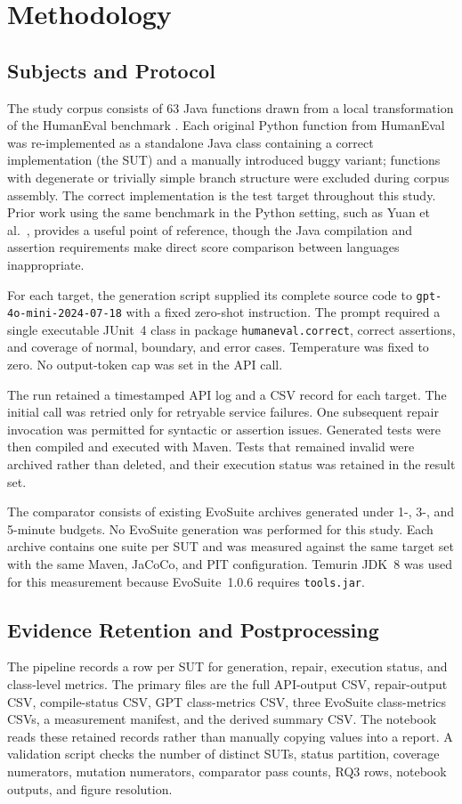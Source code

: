 \section{Methodology}
\label{sec:method}

\subsection{Subjects and Protocol}
The study corpus consists of 63 Java functions drawn from a local transformation of the HumanEval benchmark \cite{yuan2024junit}. Each original Python function from HumanEval was re-implemented as a standalone Java class containing a correct implementation (the SUT) and a manually introduced buggy variant; functions with degenerate or trivially simple branch structure were excluded during corpus assembly. The correct implementation is the test target throughout this study. Prior work using the same benchmark in the Python setting, such as Yuan et al.\ \cite{yuan2024junit}, provides a useful point of reference, though the Java compilation and assertion requirements make direct score comparison between languages inappropriate.

For each target, the generation script supplied its complete source code to \texttt{gpt-4o-mini-2024-07-18} with a fixed zero-shot instruction. The prompt required a single executable JUnit~4 class in package \texttt{humaneval.correct}, correct assertions, and coverage of normal, boundary, and error cases. Temperature was fixed to zero. No output-token cap was set in the API call.

The run retained a timestamped API log and a CSV record for each target. The initial call was retried only for retryable service failures. One subsequent repair invocation was permitted for syntactic or assertion issues. Generated tests were then compiled and executed with Maven. Tests that remained invalid were archived rather than deleted, and their execution status was retained in the result set.

The comparator consists of existing EvoSuite archives generated under 1-, 3-, and 5-minute budgets. No EvoSuite generation was performed for this study. Each archive contains one suite per SUT and was measured against the same target set with the same Maven, JaCoCo, and PIT configuration. Temurin JDK~8 was used for this measurement because EvoSuite~1.0.6 requires \texttt{tools.jar}.

\subsection{Evidence Retention and Postprocessing}
The pipeline records a row per SUT for generation, repair, execution status, and class-level metrics. The primary files are the full API-output CSV, repair-output CSV, compile-status CSV, GPT class-metrics CSV, three EvoSuite class-metrics CSVs, a measurement manifest, and the derived summary CSV. The notebook reads these retained records rather than manually copying values into a report. A validation script checks the number of distinct SUTs, status partition, coverage numerators, mutation numerators, comparator pass counts, RQ3 rows, notebook outputs, and figure resolution.


